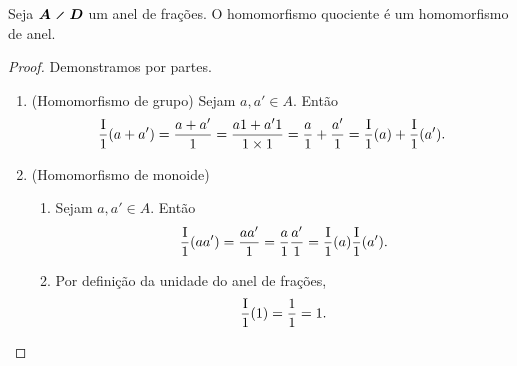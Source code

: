 \begin{proposition}
Seja $\bm{A \olddiv D}$ um anel de frações. O homomorfismo quociente é um homomorfismo de anel.
\end{proposition}
\begin{proof}Demonstramos por partes.
	\begin{enumerate}
	\item (Homomorfismo de grupo) Sejam $a,a' \in A$. Então
		\begin{equation*}
		\frac{\mathrm{I}}{1}(a+a') = \frac{a+a'}{1} = \frac{a1+a'1}{1 \times 1} = \frac{a}{1} + \frac{a'}{1} = \frac{\mathrm{I}}{1}(a) + \frac{\mathrm{I}}{1}(a').
		\end{equation*}
	
	\item (Homomorfismo de monoide)
		\begin{enumerate}
		\item Sejam $a,a' \in A$. Então
		\begin{equation*}
		\frac{\mathrm{I}}{1}(aa') = \frac{aa'}{1} = \frac{a}{1}\frac{a'}{1} = \frac{\mathrm{I}}{1}(a)\frac{\mathrm{I}}{1}(a').
		\end{equation*}
		
		\item Por definição da unidade do anel de frações,
			\begin{equation*}
			\frac{\mathrm{I}}{1}(1) = \frac{1}{1} = 1.
			\end{equation*}
		\end{enumerate}
	\end{enumerate}
\end{proof}

